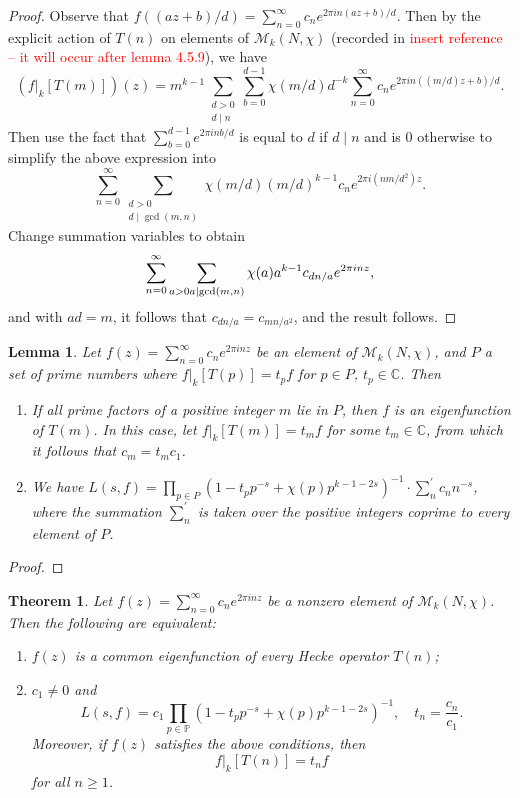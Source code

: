 \documentclass[10pt,leqno,twoside]{article}
\theoremstyle{plain}
\newtheorem{lemma}[lem]{Lemma}
\newtheorem{theorem}[lem]{Theorem}
\theoremstyle{definition}
\numberwithin{equation}{section}
\numberwithin{lem}{section}
\newcommand{\textib}[1]{\textbf{\textit{#1\index{#1}}}} %
\newcommand{\tbd}{{\Huge\color{red}{\textib{TO DO}}}}
\newcommand{\sai}[1]{\textcolor{red}{#1}}
\begin{document}
\begin{proof}
    Observe that $f((az+b)/d) = \sum_{n=0}^\infty c_ne^{2\pi in(az+b)/d}$. Then by the explicit action of $T(n)$ on elements of $\mathcal M_k(N,\chi)$ (recorded in \sai{insert reference -- it will occur after lemma 4.5.9}), we have
    \[(f|_k[T(m)])(z) = m^{k-1}\sum_{\substack{d>0\\d\mid n}}\sum_{b=0}^{d-1}\chi(m/d)d^{-k}\sum_{n=0}^\infty c_ne^{2\pi in((m/d)z+b)/d}.\] Then use the fact that $\sum_{b=0}^{d-1}e^{2\pi i n b/d}$ is equal to $d$ if $d\mid n$ and is $0$ otherwise to simplify the above expression into 
    \[\sum_{n=0}^\infty \sum_{\substack{d>0\\d\mid \gcd(m,n)}}\chi(m/d)(m/d)^{k-1}c_ne^{2\pi i(nm/d^2)z}.\] Change summation variables to obtain 
    \[\sum_{n=0}^\infty \sum_{a>0\\ a\mid \gcd(m,n)}\chi(a)a^{k-1}c_{dn/a}e^{2\pi inz},\] and with $ad = m$, it follows that $c_{dn/a} = c_{mn/a^2}$, and the result follows.
\end{proof}
\begin{lemma}\label{lem: miyake lem 4.5.15}
    Let $f(z) = \sum_{n=0}^\infty c_ne^{2\pi i n z}$ be an element of $\mathcal M_k(N,\chi)$, and $P$ a set of prime numbers where $f|_k[T(p)] = t_pf$ for $p\in P$, $t_p\in\mathbb C$. Then 
    \begin{enumerate}[label=\textup{(\arabic*)}]
        \item If all prime factors of a positive integer $m$ lie in $P$, then $f$ is an eigenfunction of $T(m)$. In this case, let $f|_k[T(m)] = t_mf$ for some $t_m\in\mathbb C$, from which it follows that $c_m = t_mc_1$.
        \item We have $L(s,f) = \prod_{p\in P}(1-t_pp^{-s} + \chi(p)p^{k-1-2s})^{-1}\cdot \sum_n^\prime c_nn^{-s}$, where the summation $\sum_n^\prime$ is taken over the positive integers coprime to every element of $P$.
    \end{enumerate}
\end{lemma}
\begin{proof}
    \tbd
\end{proof}
\begin{theorem}\label{thm: miyake thm 4.5.16}
    Let $f(z) = \sum_{n=0}^\infty c_ne^{2\pi i nz}$ be a nonzero element of $\mathcal M_k(N,\chi)$. Then the following are equivalent: \begin{enumerate}[label=\textup{(\arabic*)}]
        \item $f(z)$ is a common eigenfunction of every Hecke operator $T(n)$;
        \item $c_1\neq 0$ and 
        \[L(s,f) = c_1\prod_{p\in\mathbb P} (1-t_pp^{-s} + \chi(p)p^{k-1-2s})^{-1},\quad t_n = \frac{c_n}{c_1}.\]
        Moreover, if $f(z)$ satisfies the above conditions, then
        \[f|_k[T(n)] = t_nf\] for all $n\geq 1$.
    \end{enumerate}
\end{theorem}
\end{document}
